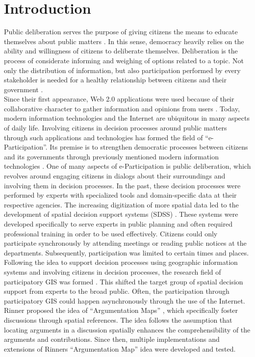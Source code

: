 \section{Introduction}
\label{chap:introduction}
Public deliberation serves the purpose of giving citizens the means to educate themselves about public matters \cite{page1996deliberates}. In this sense, democracy heavily relies on the ability and willingness of citizens to deliberate themselves. Deliberation is the process of considerate informing and weighing of options related to a topic. Not only the distribution of information, but also participation performed by every stakeholder is needed for a healthy relationship between citizens and their government \cite{Arnstein1969_citizen_participation}.\\
Since their first appearance, Web 2.0 applications were used because of their collaborative character to gather information and opinions from users \cite{o2007web}. Today, modern information technologies and the Internet are ubiquitous in many aspects of daily life. Involving citizens in decision processes around public matters through such applications and technologies has formed the field of ``e-Participation''. Its premise is to strengthen democratic processes between citizens and its governments through previously mentioned modern information technologies \cite{Saebo_eParticipation, Medaglia2012_eParticipation}. One of many aspects of e-Participation is public deliberation, which revolves around engaging citizens in dialogs about their surroundings and involving them in decision processes. In the past, these decision processes were performed by experts with specialized tools and domain-specific data at their respective agencies. The increasing digitization of more spatial data led to the development of spatial decision support systems (SDSS) \cite{densham_sdss}. These systems were developed specifically to serve experts in public planning and often required professional training in order to be used effectively. Citizens could only participate synchronously by attending meetings or reading public notices at the departments. Subsequently, participation was limited to certain times and places.\\
Following the idea to support decision processes using geographic information systems and involving citizens in decision processes, the research field of participatory GIS was formed \cite{Macintosh2004_eParticipation_characterization,Sieber2006_PublicParticipationGIS}. This shifted the target group of spatial decision support from experts to the broad public. Often, the participation through participatory GIS could happen asynchronously through the use of the Internet. Rinner proposed the idea of ``Argumentation Maps'' \cite{Rinner_ArgumentationMaps}, which specifically foster discussions through spatial references. The idea follows the assumption that locating arguments in a discussion spatially enhances the comprehensibility of the arguments and contributions. Since then, multiple implementations and extensions of Rinners ``Argumentation Map'' idea were developed and tested.\\
